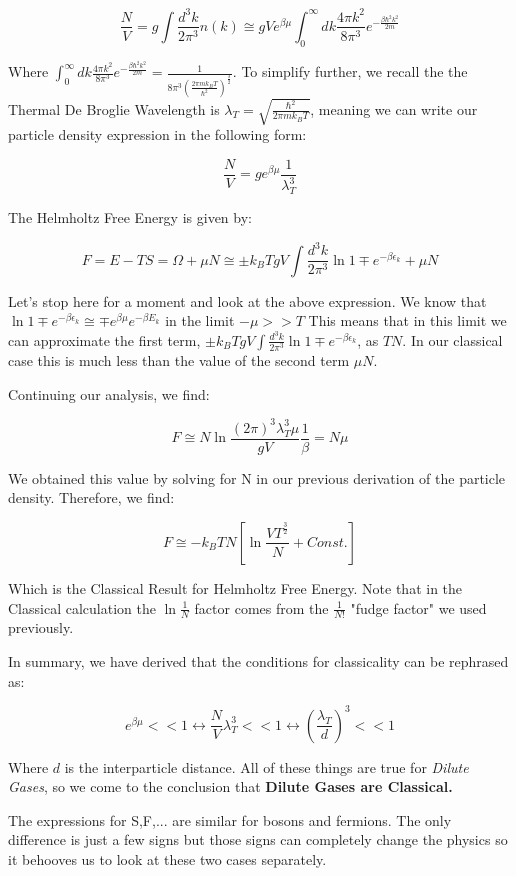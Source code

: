 \documentclass{article}
\newcommand{\bltz}{k_{B}}
\newcommand{\dtk}{\frac{d^{3}k}{2\pi^{3}}}
\newcommand{\ebk}{e^{-\beta\epsilon_{k}}}
\begin{document}
$$\frac{N}{V}=g\int\dtk n(k)\cong gVe^{\beta\mu}\int_{0}^{\infty}dk\frac{4\pi k^{2}}{8\pi^{3}}e^{-\frac{\beta\hbar^{2}k^{2}}{2m}}$$

Where $\int_{0}^{\infty}dk\frac{4\pi k^{2}}{8\pi^{3}}e^{-\frac{\beta\hbar^{2}k^{2}}{2m}}=\frac{1}{8\pi^{3}(\frac{2\pi m\bltz T}{\hbar^{2}})^{\frac{3}{2}}}$.  To simplify further, we recall the the Thermal De Broglie Wavelength is $\lambda_{T}=\sqrt{\frac{\hbar^{2}}{2\pi m\bltz T}}$, meaning we can write our particle density expression in the following form:
	
$$\frac{N}{V}=ge^{\beta\mu}\frac{1}{\lambda_{T}^{3}}$$

The Helmholtz Free Energy is given by:

$$F=E-TS=\Omega+\mu N\cong\pm\bltz T gV\int\dtk\ln{1\mp\ebk}+\mu N$$

Let's stop here for a moment and look at the above expression.  We know that $\ln{1\mp\ebk}\cong\mp e^{\beta\mu}e^{-\beta E_{k}}$ in the limit $-\mu>>T$  This means that in this limit we can approximate the first term, $\pm\bltz T gV\int\dtk\ln{1\mp\ebk}$, as $TN$.  In our classical case this is much less than the value of the second term $\mu N$.  

Continuing our analysis, we find:

$$F\cong N\ln{\frac{(2\pi)^{3}\lambda_{T}^{3}\mu}{gV}}\frac{1}{\beta}=N\mu$$

We obtained this value by solving for N in our previous derivation of the particle density.  Therefore, we find:

$$F\cong-\bltz TN[\ln{\frac{VT^{\frac{3}{2}}}{N}+Const.}]$$

Which is the Classical Result for Helmholtz Free Energy.  Note that in the Classical calculation the $\ln{\frac{1}{N}}$ factor comes from the $\frac{1}{N!}$ "fudge factor" we used previously.

In summary, we have derived that the conditions for classicality can be rephrased as:

$$e^{\beta\mu}<<1\leftrightarrow\frac{N}{V}\lambda_{T}^{3}<<1\leftrightarrow(\frac{\lambda_{T}}{d})^{3}<<1$$

Where $d$ is the interparticle distance.  All of these things are true for \textit{Dilute Gases}, so we come to the conclusion that \textbf{Dilute Gases are Classical.}

The expressions for S,F,... are similar for bosons and fermions.  The only difference is just a few signs but those signs can completely change the physics so it behooves us to look at these two cases separately.
\end{document}
